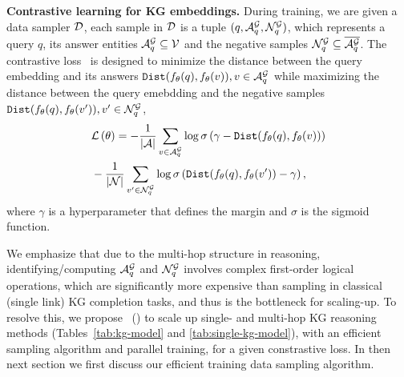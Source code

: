 


\textbf{Contrastive learning for KG embeddings.}
During training, we are given a data sampler $\mathcal{D}$, each sample in $\mathcal{D}$ is a tuple $(q,\mathcal{A}_q^{\mathcal{G}},\mathcal{N}_q^{\mathcal{G}})$, which represents a query $q$, its answer entities $\mathcal{A}_q^{\mathcal{G}}\subseteq \mathcal{V}$ and the negative samples $\mathcal{N}_q^{\mathcal{G}}\subseteq\overline{\mathcal{A}_q^{\mathcal{G}}}$. The contrastive loss~ is designed to minimize the distance between the query embedding and its answers $\texttt{Dist}(f_\theta(q), f_\theta(v)), v\in\mathcal{A}_q^{\mathcal{G}}$ while maximizing the distance between the query emebdding and the negative samples $\texttt{Dist}(f_\theta(q), f_\theta(v')), v'\in\mathcal{N}_q^{\mathcal{G}}$,
\begin{align} 
    &\mathcal{L}\left(\theta\right) = - \frac{1}{\left|\mathcal{A}\right|}\sum_{v\in \mathcal{A}_q^{\mathcal{G}}}\log \sigma \left(\gamma - \texttt{Dist}(f_\theta(q),f_\theta(v)) \right) \nonumber \\
    &- \frac{1}{\left|\mathcal{N}\right|}\sum_{v'\in\mathcal{N}_q^{\mathcal{G}}} \log \sigma \left(\texttt{Dist}(f_\theta(q),f_\theta(v'))-\gamma \right),\label{eq:lossfunc}
\end{align}
where $\gamma$ is a hyperparameter that defines the margin and $\sigma$ is the sigmoid function. 

We emphasize that due to the multi-hop structure in reasoning, identifying/computing $\mathcal{A}_q^{\mathcal{G}}$ and $\mathcal{N}_q^{\mathcal{G}}$ involves complex first-order logical operations, which are significantly more expensive than sampling in classical (single link) KG completion tasks, and thus is the bottleneck for scaling-up. 
To resolve this, we propose \modellong~(\modelshort) to scale up single- and multi-hop KG reasoning methods (Tables~\ref{tab:kg-model} and \ref{tab:single-kg-model}), with an efficient sampling algorithm and parallel training, for a given constrastive loss. In then next section we first discuss our efficient training data sampling algorithm.